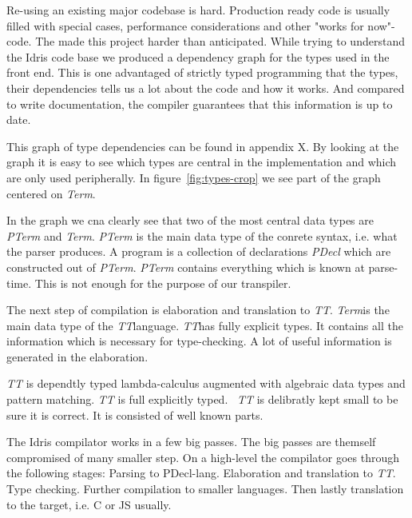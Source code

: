 Re-using an existing major codebase is hard. Production ready code is usually
filled with special cases, performance considerations and other "works for
now"-code. The made this project harder than anticipated. While trying to
understand the Idris code base we produced a dependency graph for the types
used in the front end. This is one advantaged of strictly typed programming
that the types, their dependencies tells us a lot about the code and how it
works. And compared to write documentation, the compiler guarantees that this
information is up to date.

\newcommand{\pterm}{\textit{PTerm}}
\newcommand{\pdecel}{\textit{PDecl}}
\newcommand{\term}{\textit{Term}}
\newcommand{\tti}{\textit{TT}}

This graph of type dependencies can be found in appendix X. By looking at the
graph it is easy to see which types are central in the implementation and which
are only used peripherally. In figure~\ref{fig:types-crop} we see part of the
graph centered on \textit{Term}.

In the graph we cna clearly see that two of the most central data types are
\textit{PTerm} and \textit{Term}. \textit{PTerm} is the main data type of the
conrete syntax, i.e. what the parser produces. A program is a collection of
declarations \textit{PDecl} which are constructed out of \pterm. \pterm
contains everything which is known at parse-time. This is not enough for the
purpose of our transpiler.

The next step of compilation is elaboration and translation to \tti. \term is
the main data type of the \tti language. \tti has fully explicit types. It
contains all the information which is necessary for type-checking. A lot of
useful information is generated in the elaboration.

\textit{TT} is dependtly typed lambda-calculus augmented with algebraic data
types and pattern matching. \textit{TT} is full explicitly typed.~\cite{idris}
\textit{TT} is delibratly kept small to be sure it is correct. It is consisted
of well known parts.

The Idris compilator works in a few big passes. The big passes are themself
compromised of many smaller step. On a high-level the compilator goes through
the following stages: Parsing to PDecl-lang. Elaboration and translation to
\textit{TT}. Type checking. Further compilation to smaller languages. Then
lastly translation to the target, i.e. C or JS usually.

